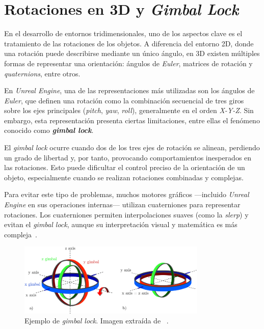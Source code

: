 \section{Rotaciones en 3D y \textit{Gimbal Lock}}

En el desarrollo de entornos tridimensionales, uno de los aspectos clave es el tratamiento de las rotaciones de los objetos. A diferencia del entorno 2D, donde una rotación puede describirse mediante un único ángulo, en 3D existen múltiples formas de representar una orientación: ángulos de \textit{Euler}, matrices de rotación y \textit{quaternions}, entre otros.

En \textit{Unreal Engine}, una de las representaciones más utilizadas son los ángulos de \textit{Euler}, que definen una rotación como la combinación secuencial de tres giros sobre los ejes principales (\textit{pitch}, \textit{yaw}, \textit{roll}), generalmente en el orden \textit{X-Y-Z}. Sin embargo, esta representación presenta ciertas limitaciones, entre ellas el fenómeno conocido como \textbf{\textit{gimbal lock}}.

El \textit{gimbal lock} ocurre cuando dos de los tres ejes de rotación se alinean, perdiendo un grado de libertad y, por tanto, provocando comportamientos inesperados en las rotaciones. Esto puede dificultar el control preciso de la orientación de un objeto, especialmente cuando se realizan rotaciones combinadas y complejas.

Para evitar este tipo de problemas, muchos motores gráficos —incluido \textit{Unreal Engine} en sus operaciones internas— utilizan cuaterniones para representar rotaciones. Los cuaterniones permiten interpolaciones suaves (como la \textit{slerp}) y evitan el \textit{gimbal lock}, aunque su interpretación visual y matemática es más compleja~\cite{shoemake1985}.

\begin{figure}[h]
	\centering
	\includegraphics[width=0.8\textwidth]{../img/memoria/gimbal_lock.png}
	\caption[Ejemplo de \textit{gimbal lock}]{Ejemplo de \textit{gimbal lock}. Imagen extraída de ~\cite{gimbalimage}.}
	\label{img:gimballock}
\end{figure}

